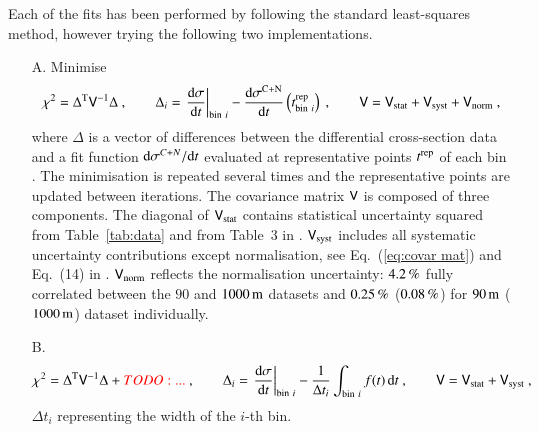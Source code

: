 Each of the fits has been performed by following the standard least-squares method, however trying the following two implementations.

\begin{enumerate}

\item[A.] Minimise
\begin{equation}
\label{eq:chi sq A}
	\chi^2 = \Delta^{\rm T} \mathsf{V}^{-1} \Delta\ ,\qquad
	\Delta_i = \left.{{\rm d}\sigma\over {\rm d} t}\right|_{{\rm bin}\ i} - {{\rm d}\sigma^{\rm C+N}\over{\rm d} t}\left(t^{\rm rep}_{{\rm bin}\ i}\right)\ ,\qquad
	\mathsf{V} = \mathsf{V}_{\rm stat} + \mathsf{V}_{\rm syst} + \mathsf{V}_{\rm norm}\ ,
\end{equation}
where $\Delta$ is a vector of differences between the differential cross-section data and a fit function ${\rm d}\sigma^{C+N}/{\rm d} t$ evaluated at representative points $t^{\rm rep}$ of each bin \cite{lafferty94}. The minimisation is repeated several times and the representative points are updated between iterations. The covariance matrix $\mathsf{V}$ is composed of three components. The diagonal of $\mathsf{V}_{\rm stat}$ contains statistical uncertainty squared from Table~\ref{tab:data} and from Table~3 in \cite{8tev-90m}. $\mathsf{V}_{\rm syst}$ includes all systematic uncertainty contributions except normalisation, see Eq.~(\ref{eq:covar mat}) and Eq.~(14) in \cite{8tev-90m}. $\mathsf{V}_{\rm norm}$ reflects the normalisation uncertainty: $4.2\,{\rm \%}$ fully correlated between the $90$ and $1000\,{\rm m}$ datasets and $0.25\,{\rm \%}$ ($0.08\,{\rm \%}$) for $90\,{\rm m}$ ($1000\,{\rm m}$) dataset individually. 


\item[B.] 
\begin{equation}
\label{eq:chi sq B}
	\chi^2 = \Delta^{\rm T} \mathsf{V}^{-1} \Delta + {\color{red}TODO: ...}\ ,\qquad
	\Delta_i = \left.{{\rm d}\sigma\over {\rm d} t}\right|_{{\rm bin}\ i} - {1\over \Delta t_i} \int_{{\rm bin}\ i} f(t)\,{\rm d} t\ ,\qquad
	\mathsf{V} = \mathsf{V}_{\rm stat} + \mathsf{V}_{\rm syst}\ ,
\end{equation}
$\Delta t_i$ representing the width of the $i$-th bin. 

\end{enumerate}


